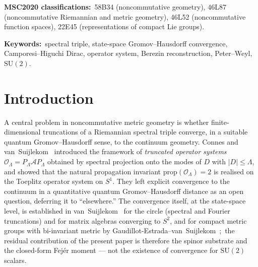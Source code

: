\documentclass[11pt,a4paper]{article}
\theoremstyle{plain}
\theoremstyle{definition}
\newcommand{\nmax}{n_{\max}}
\newcommand{\sthree}{S^{3}}
\newcommand{\Op}{\mathcal{O}}
\newcommand{\C}{\mathbb{C}}
\newcommand{\SU}{\mathrm{SU}}
\begin{document}
\begin{abstract}
the commutative factor that almost-commutative spectral-triple
constructions hosted on $\sthree$~\cite{marcolli_vs2014} take as input.
\textbf{[INTERNAL THEOREM]} The bound extends, uniformly in $k$, to
$C(\sthree) \otimes M_k(\C)$, metrized by letting the right $\SU(2)$
also rotate the matrices;\ a commutator with a finite Dirac operator
$D_F$ on $\C^k$ cannot metrize that factor. \textbf{[INTERNAL THEOREM]} For band-limited gauge fields (inner
fluctuations) the truncated spectrum converges at a factorial rate, and a pure gauge transformation of
spin $J$ reproduces every Dirac level below the window's top $2J$;\ \textbf{[MEASURED]} ($k = 2$,
$\nmax \le 3$) a generic non-abelian field metrizes the matrix factor on the window. Convergence of the
fluctuated metric is \textbf{[OPEN]}.
\end{abstract}

\bigskip\noindent
\textbf{MSC2020 classifications:}\ 58B34 (noncommutative geometry),
46L87 (noncommutative Riemannian and metric geometry),
46L52 (noncommutative function spaces),
22E45 (representations of compact Lie groups).

\medskip\noindent
\textbf{Keywords:}\ spectral triple, state-space Gromov--Hausdorff
convergence, Camporesi--Higuchi Dirac, operator system, Berezin
reconstruction, Peter--Weyl, $\SU(2)$.

\section{Introduction}\label{sec:intro}

A central problem in noncommutative metric geometry is whether
finite-dimensional truncations of a Riemannian spectral triple
converge, in a suitable quantum Gromov--Hausdorff sense, to the
continuum geometry. Connes and van~Suijlekom~\cite{connes_vs2021}
introduced the framework of \emph{truncated operator systems}
$\Op_\Lambda = P_\Lambda \mathcal{A} P_\Lambda$ obtained by spectral
projection onto the modes of $D$ with $|D| \le \Lambda$, and showed
that the natural propagation invariant $\mathrm{prop}(\Op_\Lambda) = 2$
is realised on the Toeplitz operator system on $S^1$. They left
explicit convergence to the continuum in a quantitative quantum
Gromov--Hausdorff distance as an open question, deferring it to
``elsewhere.'' The convergence itself, at the state-space level, is
established in van~Suijlekom~\cite{vs2021_jgp} for the circle
(spectral and Fourier truncations) and for matrix algebras converging to
$S^2$, and for compact metric groups with bi-invariant metric by
Gaudillot-Estrada--van~Suijlekom~\cite{gaudillot_vs2025};\ the
residual contribution of the present paper is therefore the spinor
substrate and the closed-form Fej\'er moment --- not the existence of
convergence for $\SU(2)$ scalars.
\end{document}
